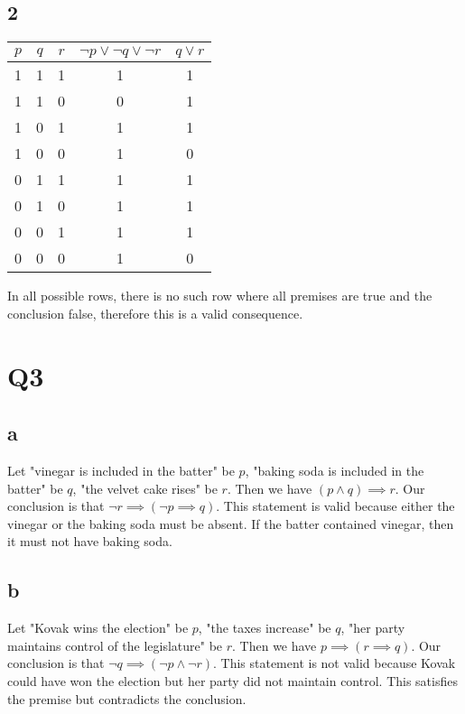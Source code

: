 \documentclass[12pt]{article}
\begin{document}
\subsection{2}
\begin{tabular}{ | c | c | c | c | c |}
    \hline
    $p$ & $q$ & $r$ & $\neg p \lor \neg q \lor \neg r$ & $q \lor r$ \\
    \hline
    1 & 1 & 1 & 1 & 1 \\
    \hline
    1 & 1 & 0 & 0 & 1 \\
    \hline
    1 & 0 & 1 & 1 & 1 \\
    \hline
    1 & 0 & 0 & 1 & 0 \\
    \hline
    0 & 1 & 1 & 1 & 1 \\
    \hline
    0 & 1 & 0 & 1 & 1 \\
    \hline
    0 & 0 & 1 & 1 & 1 \\
    \hline
    0 & 0 & 0 & 1 & 0 \\
    \hline
\end{tabular}
\newline
In all possible rows, there is no such row where all premises are true and the
conclusion false, therefore this is a valid consequence.


\section{Q3}
\subsection{a}
Let "vinegar is included in the batter" be $p$, "baking soda is included in the batter" be $q$,
"the velvet cake rises" be $r$.
\newline
Then we have $(p \land q) \implies r$. Our conclusion is that $\neg r \implies (\neg p \implies q)$.
\newline
This statement is valid because either the vinegar or the baking soda must be absent. If the batter contained
vinegar, then it must not have baking soda.

\subsection{b}
Let "Kovak wins the election" be $p$, "the taxes increase" be $q$,
"her party maintains control of the legislature" be $r$.
\newline
Then we have $p \implies (r \implies q)$. Our conclusion is that $\neg q \implies (\neg p \land \neg r)$.
\newline
This statement is not valid because Kovak could have won the election but her party did not maintain control. This
satisfies the premise but contradicts the conclusion.
\end{document}
